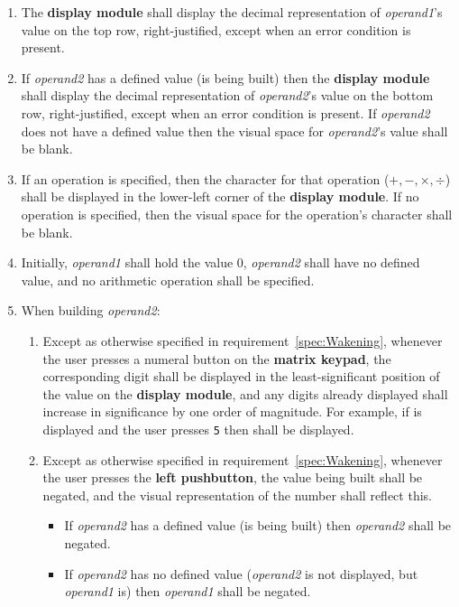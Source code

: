 \begin{enumerate}

\item The \textbf{display module} shall display the decimal representation of \textit{operand1}'s value on the top row, right-justified, except when an error condition is present.
\item If \textit{operand2} has a defined value (is being built) then the \textbf{display module} shall display the decimal representation of \textit{operand2}'s value on the bottom row, right-justified, except when an error condition is present. If \textit{operand2} does not have a defined value then the visual space for \textit{operand2}'s value shall be blank.
\item \label{spec:displayOperation} If an operation is specified, then the character for that operation ($+, -, \times, \div$) shall be displayed in the lower-left corner of the \textbf{display module}. If no operation is specified, then the visual space for the operation's character shall be blank.

\item Initially, \textit{operand1} shall hold the value 0, \textit{operand2}
    shall have no defined value, and no arithmetic operation shall be specified.
\item \label{spec:BuildingValue} When building \textit{operand2}:
    \begin{enumerate}
    \item Except as otherwise specified in requirement~\ref{spec:Wakening},
        whenever the user presses a numeral button on the \textbf{matrix
        keypad}, the corresponding digit shall be displayed in the
        least-significant position of the value on the \textbf{display module},
        and any digits already displayed shall increase in significance by one
        order of magnitude. For example, if  is displayed and the
        user presses \texttt{5} then  shall be displayed.
    \item Except as otherwise specified in requirement~\ref{spec:Wakening},
        whenever the user presses the \textbf{left pushbutton}, the value being
        built shall be negated, and the visual representation of the number shall reflect this.
        \begin{itemize}
        \item If \textit{operand2} has a defined value (is being built) then
            \textit{operand2} shall be negated.
        \item If \textit{operand2} has no defined value (\textit{operand2} is not displayed, but \textit{operand1} is) then \textit{operand1} shall be negated.
        \end{itemize}


\end{enumerate}
\end{enumerate}
